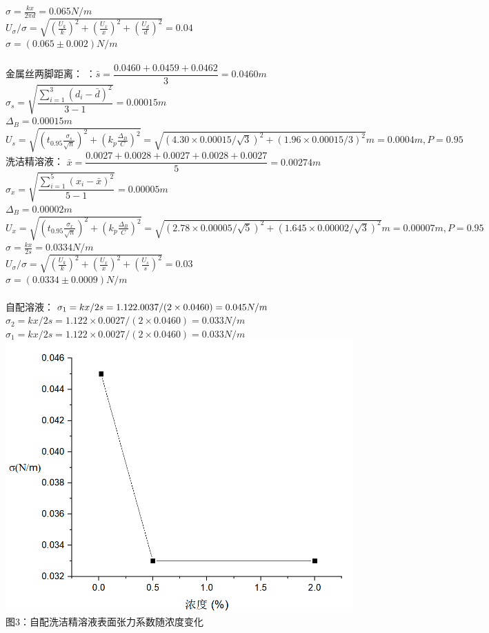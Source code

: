 \documentclass{report}
\begin{document}
$ \sigma=\frac{kx}{2\pi d}=0.065 N/m $\\
$ U_{\sigma}/\sigma=\sqrt{(\frac{U_k}{k})^2+(\frac{U_x}{x})^2+(\frac{U_d}{d})^2}=0.04 $\\
$ \sigma=(0.065\pm0.002)N/m $\\ \\
金属丝两脚距离：
：$ \bar{s}=\dfrac{0.0460+0.0459+0.0462}{3}=0.0460 m $\\
$ \sigma_{s}=\sqrt{\dfrac{\sum_{i=1}^{3}(d_i-\bar{d})^2}{3-1}}=0.00015 m $\\
$ \Delta_B=0.00015m $\\
$ U_{s}=\sqrt{(t_{0.95}\frac{\sigma_{s}}{\sqrt{n}})^2+(k_p\frac{\Delta_B}{C})^2}=\sqrt{(4.30\times0.00015/\sqrt{3})^2+(1.96\times0.00015/3)^2}m=0.0004m,P=0.95 $\\ 
洗洁精溶液：
	$ \bar{x}=\dfrac{0.0027+0.0028+0.0027+0.0028+0.0027}{5}=0.00274 m $\\
	$ \sigma_{x}=\sqrt{\dfrac{\sum_{i=1}^{5}(x_i-\bar{x})^2}{5-1}}=0.00005m $\\
	$ \Delta_B=0.00002m $\\
	$ U_{x}=\sqrt{(t_{0.95}\frac{\sigma_{x}}{\sqrt{n}})^2+(k_p\frac{\Delta_B}{C})^2}=\sqrt{(2.78\times0.00005/\sqrt{5})^2+(1.645\times0.00002/\sqrt{3})^2}m=0.00007m,P=0.95 $\\
	$ \sigma=\frac{kx}{2s}=0.0334 N/m $\\
	$ U_{\sigma}/\sigma=\sqrt{(\frac{U_k}{k})^2+(\frac{U_x}{x})^2+(\frac{U_s}{s})^2}=0.03 $\\
	$ \sigma=(0.0334\pm0.0009)N/m $\\ \\
	自配溶液：$ \sigma_1=kx/2s=1.122\time0.0037/(2\times0.0460)=0.045 N/m $\\
	$ \sigma_2=kx/2s=1.122\times0.0027/(2\times0.0460)=0.033 N/m $\\
	$ \sigma_1=kx/2s=1.122\times0.0027/(2\times0.0460)=0.033 N/m $\\
	\includegraphics[scale=0.5]{12}\\
	图3：自配洗洁精溶液表面张力系数随浓度变化
\end{document}
